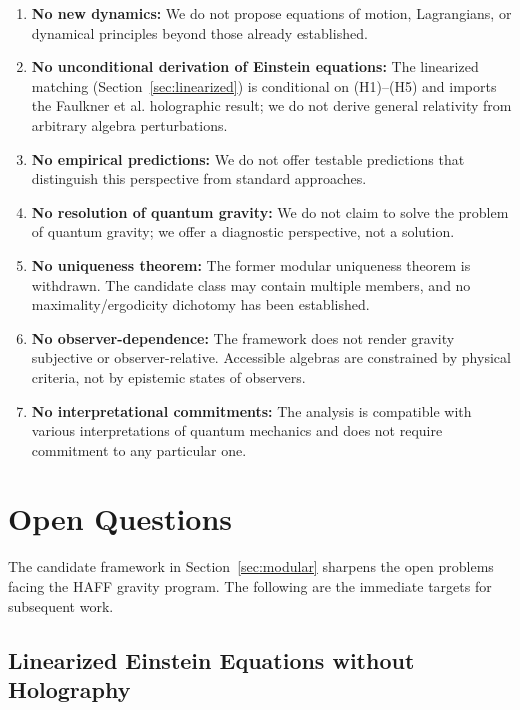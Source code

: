 \documentclass[12pt,a4paper]{article}
\begin{document}
\begin{enumerate}
    \item \textbf{No new dynamics:} We do not propose equations of motion, Lagrangians, or dynamical principles beyond those already established.
    
    \item \textbf{No unconditional derivation of Einstein equations:} The linearized matching (Section~\ref{sec:linearized}) is conditional on (H1)--(H5) and imports the Faulkner et al. holographic result; we do not derive general relativity from arbitrary algebra perturbations.
    
    \item \textbf{No empirical predictions:} We do not offer testable predictions that distinguish this perspective from standard approaches.
    
    \item \textbf{No resolution of quantum gravity:} We do not claim to solve the problem of quantum gravity; we offer a diagnostic perspective, not a solution.

    \item \textbf{No uniqueness theorem:} The former modular uniqueness theorem is withdrawn.  The candidate class may contain multiple members, and no maximality/ergodicity dichotomy has been established.
    
    \item \textbf{No observer-dependence:} The framework does not render gravity subjective or observer-relative. Accessible algebras are constrained by physical criteria, not by epistemic states of observers.
    
    \item \textbf{No interpretational commitments:} The analysis is compatible with various interpretations of quantum mechanics and does not require commitment to any particular one.
\end{enumerate}

\section{Open Questions}
\label{sec:open}

The candidate framework in Section~\ref{sec:modular} sharpens the open problems facing the HAFF gravity program. The following are the immediate targets for subsequent work.

\subsection{Linearized Einstein Equations without Holography}
\end{document}
